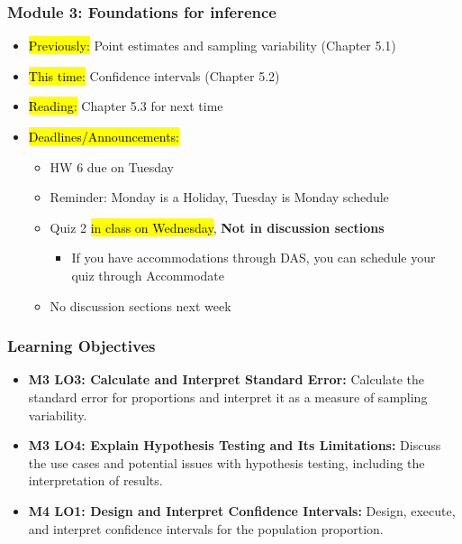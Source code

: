 \begin{frame}
    \frametitle{Module 3: Foundations for inference}
    \begin{itemize}
        \item \hl{Previously: }Point estimates and sampling variability (Chapter 5.1)
        \item \hl{This time: }Confidence intervals (Chapter 5.2)
        \item \hl{Reading: }Chapter 5.3 for next time
        \item \hl{Deadlines/Announcements: }
        \begin{itemize}
            \item HW 6 due on Tuesday
            \item Reminder: Monday is a Holiday, Tuesday is Monday schedule
            \item Quiz 2 \hl{in class on Wednesday}, \textbf{Not in discussion sections}
            \begin{itemize}
                \item If you have accommodations through DAS, you can schedule your quiz through Accommodate
            \end{itemize}
            \item No discussion sections next week
        \end{itemize}
    \end{itemize}
    
\end{frame}
    
\begin{frame}
\frametitle{Learning Objectives}
\begin{itemize}
    \item \textbf{M3 LO3: Calculate and Interpret Standard Error:} Calculate the standard error for proportions and interpret it as a measure of sampling variability. 
    \item \textbf{M3 LO4: Explain Hypothesis Testing and Its Limitations:} Discuss the use cases and potential issues with hypothesis testing, including the interpretation of results. 
    \item \textbf{M4 LO1: Design and Interpret Confidence Intervals:} Design, execute, and interpret confidence intervals for the population proportion. 
\end{itemize}
\end{frame}
